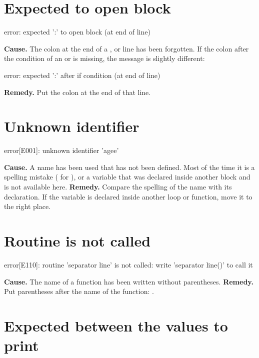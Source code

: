 \section*{Expected  to open block}

\begin{plainout}
error: expected ':' to open block (at end of line)
\end{plainout}

\textbf{Cause.} The colon at the end of a , 
or  line has been forgotten. If the colon after the condition of
an  or  is missing, the message is slightly different:

\begin{plainout}
error: expected ':' after if condition (at end of line)
\end{plainout}

\textbf{Remedy.} Put the colon at the end of that line.

\section*{Unknown identifier}

\begin{plainout}
error[E001]: unknown identifier 'agee'
\end{plainout}

\textbf{Cause.} A name has been used that has not been defined. Most of the
time it is a spelling mistake ( for ), or a variable
that was declared inside another block and is not available here.
\textbf{Remedy.} Compare the spelling of the name with its declaration. If
the variable is declared inside another loop or function, move it to the
right place.

\section*{Routine is not called}

\begin{plainout}
error[E110]: routine 'separator line' is not called: write 'separator line()' to call it
\end{plainout}

\textbf{Cause.} The name of a function has been written without
parentheses.
\textbf{Remedy.} Put parentheses after the name of the function:
\mbox{}.

\section*{Expected  between the values to print}

